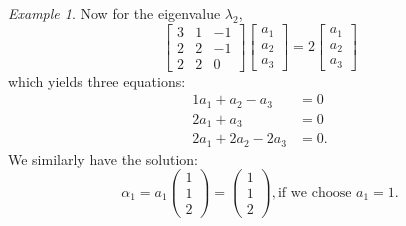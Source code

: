 \documentclass{book}
\theoremstyle{remark}
\newtheorem{example}{Example}[section]
\theoremstyle{definition}
\begin{document}
\begin{example}
Now for the eigenvalue $\lambda_2$, 
$$
\left[\begin{array}{rrr}
3 & 1 & -1 \\
2 & 2 & -1 \\
2 & 2 & 0
\end{array}\right]
\left[\begin{array}{l}
a_1 \\
a_2 \\
a_3
\end{array}\right]=
2
\left[\begin{array}{l}
a_1 \\
a_2 \\
a_3
\end{array}\right]
$$
which yields three equations:
$$
\begin{aligned}
1 a_1 + a_2 -  a_3 & =0 \\
2 a_1 + a_3 & =0 \\
2 a_1 + 2a_2 -  2a_3 & =0.
\end{aligned}
$$
We similarly have the solution:
$$
\alpha_1=
a_1\left(\begin{array}{l}
1 \\
1 \\
2
\end{array}\right) = 
\left(\begin{array}{l}
1 \\
1 \\
2
\end{array}\right), \text{if we choose } a_1 = 1.
$$

\end{example}
\end{document}
